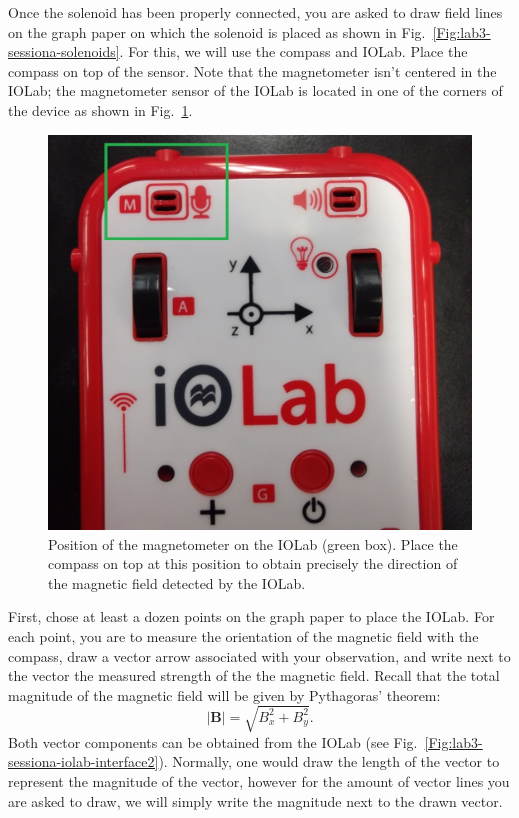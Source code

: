\documentclass[12pt]{report}
\begin{document}
Once the solenoid has been properly connected, you are asked to draw field lines on the graph paper on which the solenoid is placed as shown in Fig.~\ref{Fig:lab3-sessiona-solenoids}. For this, we will use the compass and IOLab. Place the compass on top of the sensor. Note that the magnetometer isn't centered in the IOLab; the magnetometer sensor of the IOLab is located in one of the corners of the device as shown in Fig.~\ref{Fig:lab3-sessiona-iolab-sensor}.

\begin{figure}[h]
\centering
\includegraphics[scale=0.3]{lab3-sessiona-iolab-sensor}
\caption{Position of the magnetometer on the IOLab (green box). Place the compass on top at this position to obtain precisely the direction of the magnetic field detected by the IOLab.}
\label{Fig:lab3-sessiona-iolab-sensor}
\end{figure}

First, chose at least a dozen points on the graph paper to place the IOLab. For each point, you are to measure the orientation of the magnetic field with the compass, draw a vector arrow associated with your observation, and write next to the vector the measured strength of the the magnetic field. Recall that the total magnitude of the magnetic field will be given by Pythagoras' theorem:
\begin{equation}
| \mathbf{B} | = \sqrt{B_x^2 +B_y^2}.
\end{equation}
Both vector components can be obtained from the IOLab (see Fig.~\ref{Fig:lab3-sessiona-iolab-interface2}). Normally, one would draw the length of the vector to represent the magnitude of the vector, however for the amount of vector lines you are asked to draw, we will simply write the magnitude next to the drawn vector.
\end{document}
